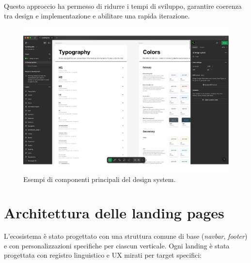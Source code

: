 Questo approccio ha permesso di ridurre i tempi di sviluppo, garantire coerenza tra design e implementazione e abilitare una rapida iterazione.

\begin{figure}[h!]
    \centering
    \includegraphics[width=\textwidth]{chapters/figures/design-system.pdf}
    \caption{Esempi di componenti principali del design system.}
    \label{fig:design-system}
\end{figure}

\section{Architettura delle landing pages}
L'ecosistema è stato progettato con una struttura comune di base (\textit{navbar}, 
\textit{footer}) e con personalizzazioni specifiche per ciascun verticale. 
Ogni landing è stata progettata con registro linguistico e UX mirati per target 
specifici:

